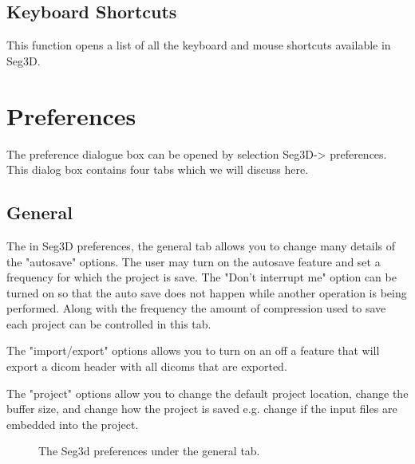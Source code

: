 \documentclass[fleqn,11pt,openany]{book}
\begin{document}
\subsection{Keyboard Shortcuts}
This function opens a list of all the keyboard and mouse shortcuts available in Seg3D.

\section{Preferences}
The preference dialogue box can be opened by selection Seg3D-> preferences.  This dialog box
contains four tabs which we will discuss here.

\subsection{General}
The in Seg3D preferences, the general tab allows you to change many details of the "autosave" options.  The user
may turn on the autosave feature and set a frequency for which the project is save.  The "Don't interrupt me" option 
can be turned on so that the auto save does not happen while another operation is being performed. Along with the
frequency the amount of compression used to save each project can be controlled in this tab.  

The "import/export" options allows you to turn on an off a feature that will export a dicom header with all dicoms that are
exported.

The "project" options allow you to change the default project location, change the buffer size, and change how the project
is saved e.g. change if the input files are embedded into the project.

\begin{figure}[h!]
\caption{The Seg3d preferences under the general tab.}\label{fig:Pref_gen}
\end{figure}
\end{document}
